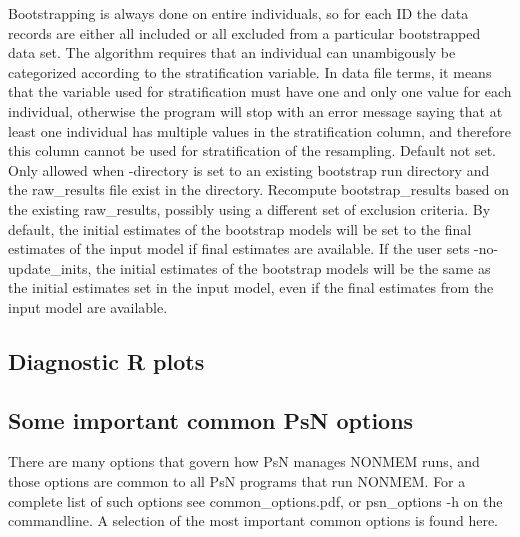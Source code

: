 \begin{optionlist}
Bootstrapping is always done on entire individuals, so for each ID the data records are either all included or all excluded from a particular bootstrapped data set. The algorithm requires that an individual can unambigously be categorized according to the stratification variable. In data file terms, it means that the variable used for stratification must have one and only one value for each individual, otherwise the program will stop with an error message saying that at least one individual 
has multiple values in the stratification column, and therefore this column cannot be used for stratification of the resampling.
\nextopt
{}
Default not set. Only allowed when -directory is set to an existing bootstrap run directory and
the raw\_results file exist in the directory. Recompute bootstrap\_results based on the existing raw\_results, possibly using a different set of exclusion criteria.
\nextopt
{}
By default, the initial estimates of the bootstrap models will be set to the final estimates of the input model if final estimates are available. If the user sets -no-update\_inits, the initial estimates of the bootstrap models will be the same as the initial estimates set in the input model, even if the final estimates from the input model are available.
\nextopt
\end{optionlist}

\subsection{Diagnostic R plots}
\newcommand{\rplotsconditions}{
See section Output, subsections Basic and Extended plots,
for descriptions of the default bootstrap plots.
The default bootstrap template 
requires the xpose4 R library of at least version 4.5.0,
and that R libraries ggplot2, plyr, dplyr are installed.
If the conditions are not fulfilled then no pdf will be generated,
see the .Rout file in the main run directory for error messages.
}


\subsection{Some important common PsN options}
There are many options that govern how PsN manages NONMEM runs, and
those options are common to all PsN programs that run NONMEM.
For a complete list of such options see common\_options.pdf, 
or psn\_options -h on the commandline. A selection of
the most important common options is found here.



